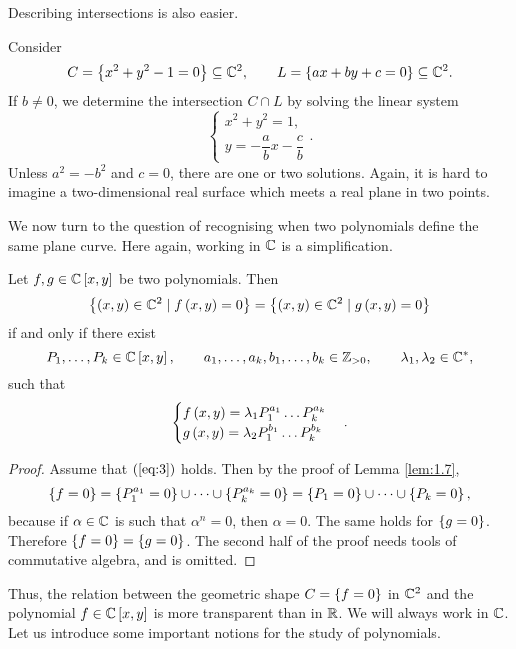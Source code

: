 Describing intersections is also easier.

\begin{example}
Consider
$$ C = \left\{ x^2 + y^2 - 1 = 0 \right\} \subseteq \mathbb{C}^2, \qquad L = \left\{ ax + by + c = 0 \right\} \subseteq \mathbb{C}^2. $$
If $ b \ne 0 $, we determine the intersection $ C \cap L $ by solving the linear system
$$
\begin{cases}
x^2 + y^2 = 1, \\
y = -\dfrac{a}{b}x - \dfrac{c}{b}
\end{cases}.
$$
Unless $ a^2 = -b^2 $ and $ c = 0 $, there are one or two solutions. Again, it is hard to imagine a two-dimensional real surface which meets a real plane in two points.
\end{example}

We now turn to the question of recognising when two polynomials define the same plane curve. Here again, working in $ \mathbb{C} $ is a simplification.

\begin{theorem}
\label{thm:2.10}
Let $ f, g \in \mathbb{C}\left[ x, y \right] $ be two polynomials. Then
$$ \left\{ \left( x, y \right) \in \mathbb{C}^2 \mid f\left( x, y \right) = 0 \right\} = \left\{ \left( x, y \right) \in \mathbb{C}^2 \mid g\left( x, y \right) = 0 \right\} $$
if and only if there exist
$$ P_1, \dots, P_k \in \mathbb{C}\left[ x, y \right], \qquad a_1, \dots, a_k, b_1, \dots, b_k \in \mathbb{Z}_{> 0}, \qquad \lambda_1, \lambda_2 \in \mathbb{C}^*, $$
such that
\begin{equation}
\label{eq:3}
\begin{cases}
f\left( x, y \right) = \lambda_1 P_1^{a_1} \dots P_k^{a_k} \\
g\left( x, y \right) = \lambda_2 P_1^{b_1} \dots P_k^{b_k}
\end{cases}.
\end{equation}
\end{theorem}


\begin{proof}
Assume that $ \left( \ref{eq:3} \right) $ holds. Then by the proof of Lemma \ref{lem:1.7},
$$ \left\{ f = 0 \right\} = \left\{ P_1^{a_1} = 0 \right\} \cup \dots \cup \left\{ P_k^{a_k} = 0 \right\} = \left\{ P_1 = 0 \right\} \cup \dots \cup \left\{ P_k = 0 \right\}, $$
because if $ \alpha \in \mathbb{C} $ is such that $ \alpha^n = 0 $, then $ \alpha = 0 $. The same holds for $ \left\{ g = 0 \right\} $. Therefore $ \left\{ f = 0 \right\} = \left\{ g = 0 \right\} $. The second half of the proof needs tools of commutative algebra, and is omitted.
\end{proof}

Thus, the relation between the geometric shape $ C = \left\{ f = 0 \right\} $ in $ \mathbb{C}^2 $ and the polynomial $ f \in \mathbb{C}\left[ x, y \right] $ is more transparent than in $ \mathbb{R} $. We will always work in $ \mathbb{C} $. Let us introduce some important notions for the study of polynomials.

